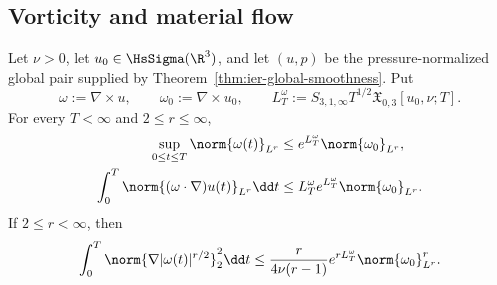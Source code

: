 \subsection{Vorticity and material flow}

\begin{theorem}
\label{thm:app-vorticity-amplification}
Let \(\nu>0\), let \(u_0\in\HsSigma(\R^3)\), and let \((u,p)\) be the
pressure-normalized global pair supplied by
Theorem~\ref{thm:ier-global-smoothness}.  Put
\[
 \omega:=\nabla\times u,
 \qquad
 \omega_0:=\nabla\times u_0,
 \qquad
 L_T^\omega:=S_{3,1,\infty}T^{1/2}
 \mathfrak X_{0,3}[u_0,\nu;T].
\]
For every \(T<\infty\) and \(2\le r\le\infty\),
\begin{align}
 \sup_{0\le t\le T}\norm{\omega(t)}_{L^r}
 &\le e^{L_T^\omega}\norm{\omega_0}_{L^r},
 \label{eq:app-vorticity-Lr-amplification}\\
 \int_0^T\norm{(\omega\cdot\nabla)u(t)}_{L^r}\dd t
 &\le L_T^\omega e^{L_T^\omega}\norm{\omega_0}_{L^r}.
 \label{eq:app-vortex-stretching-action}
\end{align}
If \(2\le r<\infty\), then
\begin{equation}
 \int_0^T\norm{\nabla|\omega(t)|^{r/2}}_2^2\dd t
 \le \frac{r}{4\nu(r-1)}e^{rL_T^\omega}
       \norm{\omega_0}_{L^r}^r.
 \label{eq:app-vorticity-dissipation}
\end{equation}
\end{theorem}

